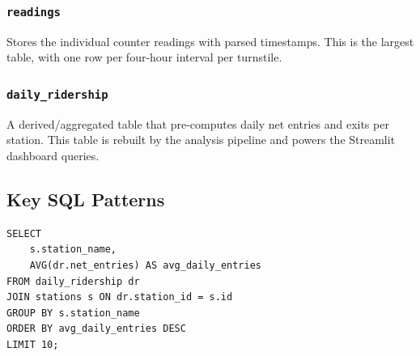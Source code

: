 \subsubsection{\texttt{readings}}
Stores the individual counter readings with parsed timestamps.
This is the largest table, with one row per four-hour interval per turnstile.

\subsubsection{\texttt{daily\_ridership}}
A derived/aggregated table that pre-computes daily net entries and exits per
station. This table is rebuilt by the analysis pipeline and powers the
Streamlit dashboard queries.

\subsection{Key SQL Patterns}


\begin{lstlisting}[style=sqlstyle, caption={Example: Top 10 stations by average daily entries}]
SELECT
    s.station_name,
    AVG(dr.net_entries) AS avg_daily_entries
FROM daily_ridership dr
JOIN stations s ON dr.station_id = s.id
GROUP BY s.station_name
ORDER BY avg_daily_entries DESC
LIMIT 10;
\end{lstlisting}
